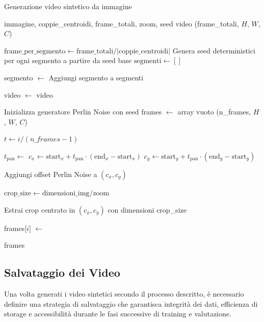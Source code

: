 \begin{algorithm}[H]
\caption{Generazione video sintetico da immagine}
\label{alg:video_generation}
\begin{algorithmic}[1]
\Require immagine, coppie\_centroidi, frame\_totali, zoom, seed
\Ensure video (frame\_totali, $H$, $W$, $C$)

\State $\text{frame\_per\_segmento} \gets \text{frame\_totali} / |\text{coppie\_centroidi}|$
\State Genera seed deterministici per ogni segmento a partire da seed base
\State $\text{segmenti} \gets [ ]$

    \State segmento $\gets$ 
    \State Aggiungi segmento a segmenti
\EndFor

\State video $\gets$ 
\State \Return video

\vspace{0.5em}

    \State Inizializza generatore Perlin Noise con seed
    \State frames $\gets$ array vuoto (n\_frames, $H$, $W$, $C$)
    
        \State $t \gets i / (n\_frames - 1)$
        
        \State $t_{\text{pan}} \gets$  
        \State $c_x \gets \text{start}_x + t_{\text{pan}} \cdot (\text{end}_x - \text{start}_x)$
        \State $c_y \gets \text{start}_y + t_{\text{pan}} \cdot (\text{end}_y - \text{start}_y)$
        
        \State Aggiungi offset Perlin Noise a $(c_x, c_y)$
        
        \State $\text{crop\_size} \gets \text{dimensioni\_img} / \text{zoom}$
        
        \State Estrai crop centrato in $(c_x, c_y)$ con dimensioni crop\_size
        
        \State frames[$i$] $\gets$ 
    \EndFor
    
    \State \Return frames
\EndFunction
\end{algorithmic}
\end{algorithm}

\subsection{Salvataggio dei Video}
Una volta generati i video sintetici secondo il processo descritto, è necessario definire una strategia di salvataggio che garantisca integrità dei dati, efficienza di storage e accessibilità durante le fasi successive di training e valutazione.

